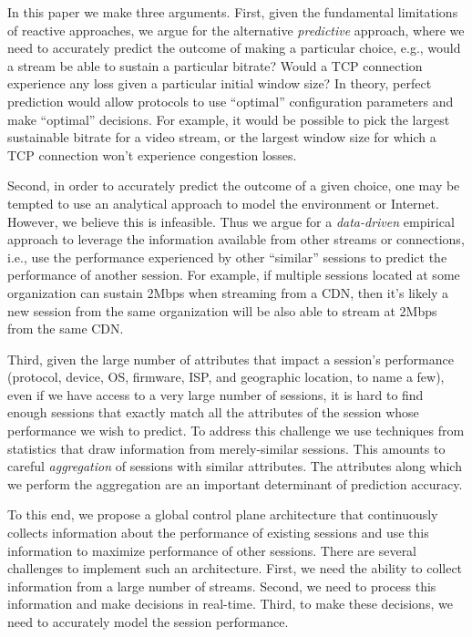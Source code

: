 In this paper we make three arguments. First, given the fundamental limitations of reactive approaches, we argue for the alternative \emph{predictive} approach, where we need to accurately predict the outcome of making a particular choice, e.g., would a stream be able to sustain a particular bitrate? Would a TCP connection experience any loss given a particular initial window size? In theory, perfect prediction would allow protocols to use ``optimal'' configuration parameters and make ``optimal'' decisions. For example, it would be possible to pick the largest sustainable bitrate for a video stream, or the largest window size for which a TCP connection won't experience congestion losses.

Second, in order to accurately predict the outcome of a given choice, one may be tempted to use an analytical approach to model the environment or Internet. However, we believe this is infeasible. Thus we argue for a \emph{data-driven} empirical approach to leverage the information available from other streams or connections, i.e., use the performance experienced by other ``similar'' sessions to predict the performance of another session. For example, if multiple sessions located at some organization can sustain 2Mbps when streaming from a CDN, then it's likely a new session from the same organization will be also able to stream at 2Mbps from the same CDN.

Third, given the large number of attributes that impact a session's performance (protocol, device, OS, firmware, ISP, and geographic location, to name a few), even if we have access to a very large number of sessions, it is hard to find enough sessions that exactly match all the attributes of the session whose performance we wish to predict. To address this challenge we use techniques from statistics that draw information from merely-similar sessions.  This amounts to careful \emph{aggregation} of sessions with similar attributes.  The attributes along which we perform the aggregation are an important determinant of prediction accuracy.

To this end, we propose a global control plane architecture that continuously collects information about the performance of existing sessions and use this information to maximize performance of other sessions. There are several challenges to implement such an architecture. First, we need the ability to collect information from a large number of streams. Second, we need to process this information and make decisions in real-time. Third, to make these decisions, we need to accurately model the session performance. 


